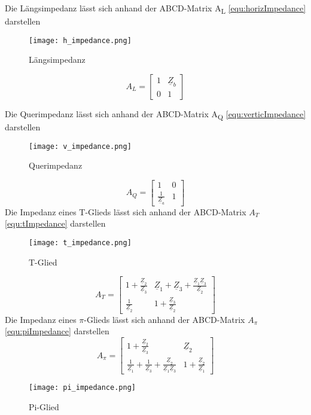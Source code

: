 Die Längsimpedanz lässt sich anhand der ABCD-Matrix A\textsubscript{L} \ref{equ:horizImpedance} darstellen
\begin{figure}[H]
	\centering
	\texttt{[image: h\_impedance.png]}
	\label{fig:horizImpedance}
	\caption{Längsimpedanz}
\end{figure}
\begin{equation}\label{equ:horizImpedance}
	A_L = \left[\begin{matrix}
	1&\underline{Z}_b\\0&1
	\end{matrix}\right]
\end{equation}

Die Querimpedanz lässt sich anhand der ABCD-Matrix A\textsubscript{Q} \ref{equ:verticImpedance} darstellen
\begin{figure}[H]
	\centering
	\texttt{[image: v\_impedance.png]}
	\label{fig:verticImpedance}
	\caption{Querimpedanz}
\end{figure}
\begin{equation}\label{equ:verticImpedance}
	A_Q = \left[\begin{matrix}
	1&0\\\frac{1}{\underline{Z}_a}&1
	\end{matrix}\right]
\end{equation}
Die Impedanz eines T-Glieds lässt sich anhand der ABCD-Matrix $A_T$ \ref{equ:tImpedance} darstellen
\begin{figure}[H]
	\centering
	\texttt{[image: t\_impedance.png]}
	\label{fig:tImpedance}
	\caption{T-Glied}
\end{figure}
\begin{equation}\label{equ:tImpedance}
	A_T = \left[\begin{matrix}
	1+\frac{\underline{Z}_2}{\underline{Z}_3}&\underline{Z}_1+\underline{Z}_3+\frac{\underline{Z}_1\underline{Z}_3}{\underline{Z}_2}\\
	\frac{1}{\underline{Z}_2}&1+\frac{\underline{Z}_3}{\underline{Z}_2}
	\end{matrix}\right]
\end{equation}
Die Impedanz eines  $\pi$-Glieds lässt sich anhand der ABCD-Matrix $A_\pi$   \ref{equ:piImpedance} darstellen
\begin{equation}\label{equ:piImpedance}
	A_\pi = \left[\begin{matrix}
	1+\frac{\underline{Z}_2}{\underline{Z}_3}&\underline{Z}_2\\
	\frac{1}{\underline{Z}_1}+\frac{1}{\underline{Z}_3}+\frac{\underline{Z}_2}{\underline{Z}_1\underline{Z}_3}&1+\frac{\underline{Z}_2}{\underline{Z}_1}
	\end{matrix}\right]
\end{equation}
\begin{figure}[H]
	\centering
	\texttt{[image: pi\_impedance.png]}
	\label{fig:piImpedance}
	\caption{Pi-Glied}
\end{figure}

